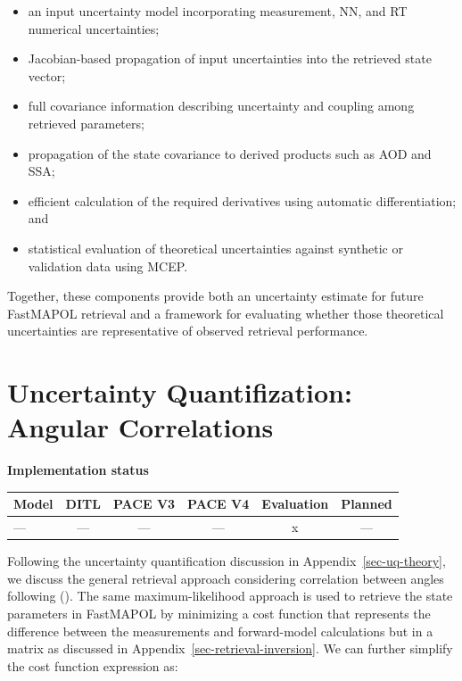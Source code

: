 \documentclass[
  11pt,
  letterpaper,
]{scrreprt}
\providecommand{\tightlist}{%
  \setlength{\itemsep}{0pt}\setlength{\parskip}{0pt}}
\begin{document}
\begin{itemize}
\tightlist
\item
  an input uncertainty model incorporating measurement, NN, and RT
  numerical uncertainties;
\item
  Jacobian-based propagation of input uncertainties into the retrieved
  state vector;
\item
  full covariance information describing uncertainty and coupling among
  retrieved parameters;
\item
  propagation of the state covariance to derived products such as AOD
  and SSA;
\item
  efficient calculation of the required derivatives using automatic
  differentiation; and
\item
  statistical evaluation of theoretical uncertainties against synthetic
  or validation data using MCEP.
\end{itemize}

Together, these components provide both an uncertainty estimate for
future FastMAPOL retrieval and a framework for evaluating whether those
theoretical uncertainties are representative of observed retrieval
performance.

\chapter{Uncertainty Quantifization: Angular
Correlations}\label{sec-uq-correlation}

\textbf{Implementation status}

\begin{longtable}[]{@{}lccccc@{}}
\toprule\noalign{}
Model & DITL & PACE V3 & PACE V4 & Evaluation & Planned \\
\midrule\noalign{}
\endhead
\bottomrule\noalign{}
\endlastfoot
--- & --- & --- & --- & x & --- \\
\end{longtable}

Following the uncertainty quantification discussion in
Appendix~\ref{sec-uq-theory}, we discuss the general retrieval approach
considering correlation between angles following
(). The same
maximum-likelihood approach is used to retrieve the state parameters in
FastMAPOL by minimizing a cost function that represents the difference
between the measurements and forward-model calculations but in a matrix
as discussed in Appendix~\ref{sec-retrieval-inversion}. We can further
simplify the cost function expression as:
\end{document}
